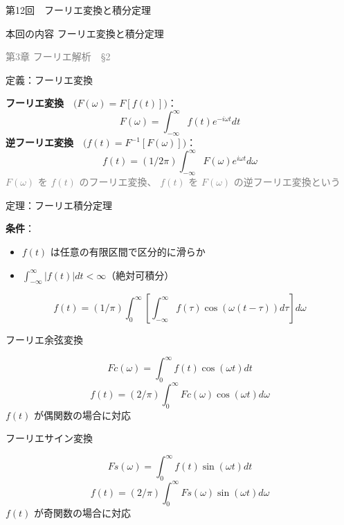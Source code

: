 \documentclass[professionalfonts]{beamer}
\begin{document}
\begin{frame}{第12回　フーリエ変換と積分定理}
  \begin{block}{本回の内容}
  フーリエ変換と積分定理
  \end{block}
  \vfill\hfill{\scriptsize \textcolor{gray}{第3章 フーリエ解析　§2}}
\end{frame}

\begin{frame}{定義：フーリエ変換}
  \begin{block}{}
  \medskip\textbf{フーリエ変換}　$\bigl(F(\omega) = F[f(t)]\bigr)$：
  \[
    F(\omega) = \int_{-\infty}^{\infty} f(t) e^{-i\omega t} dt
  \]
  \medskip\textbf{逆フーリエ変換}　$\bigl(f(t) = F^{-1}[F(\omega)]\bigr)$：
  \[
    f(t) = (1/2\pi) \int_{-\infty}^{\infty} F(\omega) e^{i\omega t} d\omega
  \]
  {\footnotesize \textcolor{gray}{$F(\omega)$ を $f(t)$ のフーリエ変換、 $f(t)$ を $F(\omega)$ の逆フーリエ変換という}}
  \end{block}
\end{frame}

\begin{frame}{定理：フーリエ積分定理}
  \begin{block}{}
  \textbf{条件}：
  \begin{itemize}
    \item $f(t)$ は任意の有限区間で区分的に滑らか
    \item $\int_{-\infty}^{\infty} |f(t)| dt < \infty$（絶対可積分）
  \end{itemize}
  \[
    f(t) = (1/\pi) \int_{0}^\infty [\int_{-\infty}^{\infty} f(\tau)\cos(\omega(t-\tau)) d\tau] d\omega
  \]
  \end{block}
\end{frame}

\begin{frame}{フーリエ余弦変換}
  \begin{block}{}
  \[
    Fc(\omega) = \int_{0}^\infty f(t)\cos(\omega t) dt
  \]
  \[
    f(t) = (2/\pi) \int_{0}^\infty Fc(\omega)\cos(\omega t) d\omega
  \]
  {\footnotesize $f(t)$ が偶関数の場合に対応}
  \end{block}
\end{frame}

\begin{frame}{フーリエサイン変換}
  \begin{block}{}
  \[
    Fs(\omega) = \int_{0}^\infty f(t)\sin(\omega t) dt
  \]
  \[
    f(t) = (2/\pi) \int_{0}^\infty Fs(\omega)\sin(\omega t) d\omega
  \]
  {\footnotesize $f(t)$ が奇関数の場合に対応}
  \end{block}
\end{frame}
\end{document}
